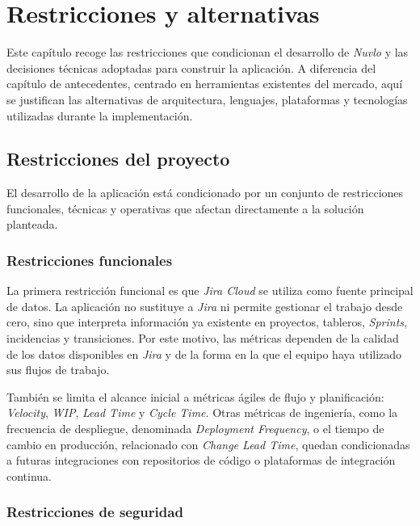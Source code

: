 \chapter{Restricciones y alternativas}
\label{restriccionesAlternativas}

Este capítulo recoge las restricciones que condicionan el desarrollo de \textit{Nuvlo} y las decisiones técnicas adoptadas para construir la aplicación. A diferencia del capítulo de antecedentes, centrado en herramientas existentes del mercado, aquí se justifican las alternativas de arquitectura, lenguajes, plataformas y tecnologías utilizadas durante la implementación.

\section{Restricciones del proyecto}

El desarrollo de la aplicación está condicionado por un conjunto de restricciones funcionales, técnicas y operativas que afectan directamente a la solución planteada.

\subsection{Restricciones funcionales}

La primera restricción funcional es que \textit{Jira Cloud} se utiliza como fuente principal de datos. La aplicación no sustituye a \textit{Jira} ni permite gestionar el trabajo desde cero, sino que interpreta información ya existente en proyectos, tableros, \textit{Sprints}, incidencias y transiciones. Por este motivo, las métricas dependen de la calidad de los datos disponibles en \textit{Jira} y de la forma en la que el equipo haya utilizado sus flujos de trabajo.

También se limita el alcance inicial a métricas ágiles de flujo y planificación: \textit{Velocity}, \textit{WIP}, \textit{Lead Time} y \textit{Cycle Time}. Otras métricas de ingeniería, como la frecuencia de despliegue, denominada \textit{Deployment Frequency}, o el tiempo de cambio en producción, relacionado con \textit{Change Lead Time}, quedan condicionadas a futuras integraciones con repositorios de código o plataformas de integración continua.

\subsection{Restricciones de seguridad}

